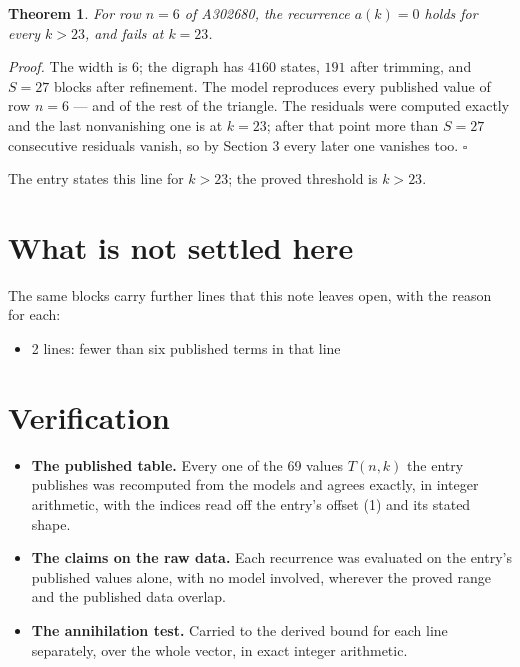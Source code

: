 \documentclass[11pt]{article}
\newtheorem{theorem}{Theorem}
\theoremstyle{definition}
\begin{document}
\begin{theorem} For row $n = 6$ of A302680, the recurrence $a(k) = 0$ holds for every $k > 23$, and fails at $k = 23$.\end{theorem}

{\itshape Proof.} The width is $6$; the digraph has $4160$ states, $191$ after trimming, and $S = 27$ blocks after refinement. The model reproduces every published value of row $n = 6$ --- and of the rest of the triangle. The residuals were computed exactly and the last nonvanishing one is at $k = 23$; after that point more than $S = 27$ consecutive residuals vanish, so by Section 3 every later one vanishes too. $\square$

The entry states this line for $k > 23$; the proved threshold is $k > 23$.

\section{What is not settled here}

The same blocks carry further lines that this note leaves open, with the reason for each:

\begin{itemize}

\item 2 lines: fewer than six published terms in that line

\end{itemize}

\section{Verification}

\begin{itemize}

\item {\bfseries The published table.} Every one of the 69 values $T(n,k)$ the entry publishes was recomputed from the models and agrees exactly, in integer arithmetic, with the indices read off the entry's offset (1) and its stated shape.

\item {\bfseries The claims on the raw data.} Each recurrence was evaluated on the entry's published values alone, with no model involved, wherever the proved range and the published data overlap.

\item {\bfseries The annihilation test.} Carried to the derived bound for each line separately, over the whole vector, in exact integer arithmetic.

\end{itemize}
\end{document}
